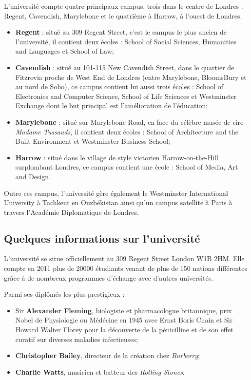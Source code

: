 L'universit\'e compte quatre principaux campus, trois dans le centre de Londres : Regent, Cavendish, Marylebone et le quatri\`eme \`a Harrow, \`a l'ouest de Londres.
\begin{itemize}
	\item \textbf{Regent} : situ\'e au 309 Regent Street, c'est le campus le plus ancien de l'universit\'e, il contient deux \'ecoles : 
		School of Social Sciences, Humanities and Languages et School of Law;

	\item \textbf{Cavendish} : situ\'e au 101-115 New Cavendish Street, dans le quartier de Fitzrovia proche de West End de Londres (entre Marylebone, BloomsBury et au nord de Soho), ce campus contient lui aussi trois \'ecoles : 
		School of Electronics and Computer Science, School of Life Sciences et Westminster Exchange dont le but principal est l'am\'elioration de l'\'education;


	\item \textbf{Marylebone} : situ\'e sur Marylebone Road, en face du c\'el\`ebre mus\'ee de cire \textit{Madame Tussauds}, il contient deux \'ecoles :
		School of Architecture and the Built Environment et Westminster Business School;

	\item \textbf{Harrow} : situ\'e dans le village de style victorien Harrow-on-the-Hill surplombant Londres, ce campus contient une \'ecole : 
		School of Media, Art and Design.

\end{itemize}

Outre ces campus, l'universit\'e g\`ere \'egalement le Westminster International University \`a Tachkent en Ouzb\'ekistan ainsi qu'un campus satellite \`a Paris \`a travers l'Acad\'emie Diplomatique de Londres.

\subsection{Quelques informations sur l'universit\'e}

L'universit\'e se situe officiellement au 309 Regent Street London W1B 2HM.
Elle compte en 2011 plus de 20000 \'etudiants venant de plus de 150 nations diff\'erentes gr\^ace \`a de nombreux programmes d'\'echange avec d'autres universit\'es.

\noindent Parmi ses dipl\^om\'es les plus prestigieux :
\begin{itemize}
	\item Sir \textbf{Alexander Fleming}, biologiste et pharmacologue britannique, prix Nobel de Physiologie ou M\'ed\'ecine en 1945 avec Ernst Boris Chain et Sir Howard Walter Florey pour la d\'ecouverte de la p\'enicilline et de son effet curatif sur diverses maladies infectieuses;
	\item \textbf{Christopher Bailey}, directeur de la cr\'eation chez \textit{Burberry};
	\item \textbf{Charlie Watts}, musicien et batteur des \textit{Rolling Stones}.

\end{itemize}

